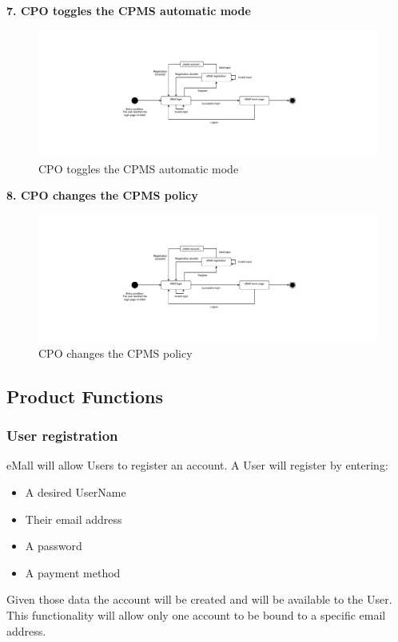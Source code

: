 \documentclass[11pt]{article}
\begin{document}
\begin{description}
    \item \textbf{7. CPO toggles the CPMS automatic mode}
    \begin{figure}[!ht]
        \includegraphics[page={7}, width=\linewidth, trim=10cm 5cm 10cm 5cm, clip]{StateCharts.pdf}
        \caption{CPO toggles the CPMS automatic mode}
    \end{figure}
    
    \item \textbf{8. CPO changes the CPMS policy}
    \begin{figure}[!ht]
        \includegraphics[page={8}, width=\linewidth, trim=6.8cm 5cm 7cm 5cm, clip]{StateCharts.pdf}
        \caption{CPO changes the CPMS policy}
    \end{figure}
\end{description}

\subsection{Product Functions}
\label{subsec:prodfunctions}

\subsubsection{User registration}

eMall will allow Users to register an account. A User will register by entering:
\begin{itemize}
    \item A desired UserName
    \item Their email address
    \item A password
    \item A payment method
\end{itemize}
Given those data the account will be created and will be available to the User. This functionality will allow only one account to be bound to a specific email address.
\end{document}
